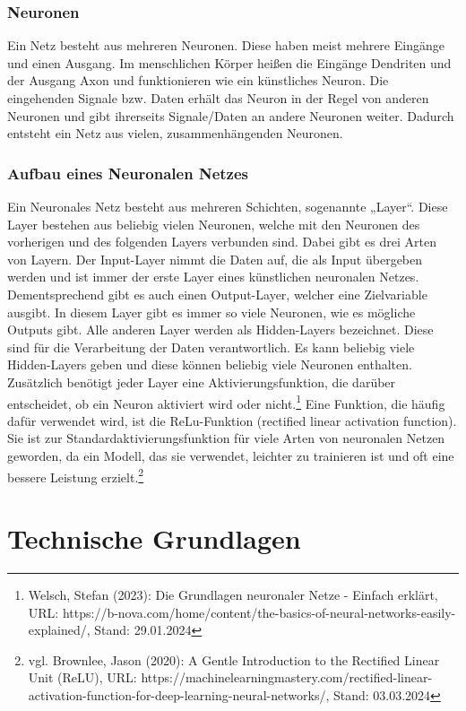 \documentclass[11pt,oneside]{report}
\begin{document}
\subsection{Neuronen}
Ein Netz besteht aus mehreren Neuronen. Diese haben meist mehrere Eingänge und einen Ausgang. Im menschlichen Körper heißen die Eingänge Dendriten und der Ausgang Axon und funktionieren wie ein künstliches Neuron. Die eingehenden Signale bzw. Daten erhält das Neuron in der Regel von anderen Neuronen und gibt ihrerseits Signale/Daten an andere Neuronen weiter. Dadurch entsteht ein Netz aus vielen, zusammenhängenden Neuronen.

\subsection{Aufbau eines Neuronalen Netzes}
Ein Neuronales Netz besteht aus mehreren Schichten, sogenannte „Layer“. Diese Layer bestehen aus beliebig vielen Neuronen, welche mit den Neuronen des vorherigen und des folgenden Layers verbunden sind. Dabei gibt es drei Arten von Layern. Der Input-Layer nimmt die Daten auf, die als Input übergeben werden und ist immer der erste Layer eines künstlichen neuronalen Netzes. Dementsprechend gibt es auch einen Output-Layer, welcher eine Zielvariable ausgibt. In diesem Layer gibt es immer so viele Neuronen, wie es mögliche Outputs gibt. Alle anderen Layer werden als Hidden-Layers bezeichnet. Diese sind für die Verarbeitung der Daten verantwortlich. Es kann beliebig viele Hidden-Layers geben und diese können beliebig viele Neuronen enthalten. Zusätzlich benötigt jeder Layer eine Aktivierungsfunktion, die darüber entscheidet, ob ein Neuron aktiviert wird oder nicht.\footnote{Welsch, Stefan (2023): Die Grundlagen neuronaler Netze - Einfach erklärt, URL: https://b-nova.com/home/content/the-basics-of-neural-networks-easily-explained/, Stand: 29.01.2024} Eine Funktion, die häufig dafür verwendet wird, ist die ReLu-Funktion (rectified linear activation function). Sie ist zur Standardaktivierungsfunktion für viele Arten von neuronalen Netzen geworden, da ein Modell, das sie verwendet, leichter zu trainieren ist und oft eine bessere Leistung erzielt.\footnote{vgl. Brownlee, Jason (2020): A Gentle Introduction to the Rectified Linear Unit (ReLU), URL: https://machinelearningmastery.com/rectified-linear-activation-function-for-deep-learning-neural-networks/, Stand: 03.03.2024}


\chapter{Technische Grundlagen}
\end{document}
